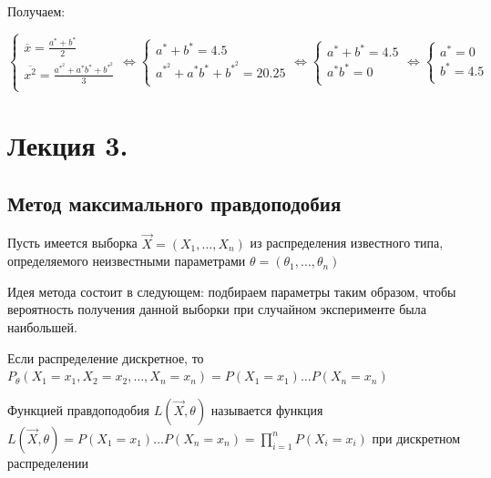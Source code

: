 \documentclass[12pt]{article}
\begin{document}
\mediumvspace

Получаем:

$\begin{cases}
    \overline{x} = \frac{a^* + b^*}{2} \\ 
    \overline{x^2} = \frac{a^*^2 + a^* b^* + b^*^2}{3} \\ 
\end{cases} \Longleftrightarrow \begin{cases}
    a^* + b^* = 4.5 \\ 
    a^*^2 + a^* b^* + b^*^2 = 20.25 \\ 
\end{cases} \Longleftrightarrow \begin{cases}
    a^* + b^* = 4.5 \\ 
    a^* b^* = 0 \\ 
\end{cases} \Longleftrightarrow \begin{cases}
    a^* = 0 \\ 
    b^* = 4.5 \\ 
\end{cases}$










\section{Лекция 3.}

\subsection{Метод максимального правдоподобия}

\hypertarget{maximum_likelihood_estimation}{}

Пусть имеется выборка $\vec{X} = (X_1, \dots, X_n)$ из распределения известного типа, определяемого неизвестными параметрами 
$\theta = (\theta_1, \dots, \theta_n)$

Идея метода состоит в следующем: подбираем параметры таким образом, чтобы вероятность получения
данной выборки при случайном эксперименте была наибольшей.

Если распределение дискретное, то $P_{\theta} (X_1 = x_1, X_2 = x_2, \dots, X_n = x_n) = P(X_1 = x_1) \dots P(X_n = x_n)$

\Def Функцией правдоподобия $L(\vec{X}, \theta)$ называется функция $L(\vec{X}, \theta) = P(X_1 = x_1) \dots P(X_n = x_n) = \prod_{i = 1}^n P(X_i = x_i)$ при дискретном распределении
\end{document}
